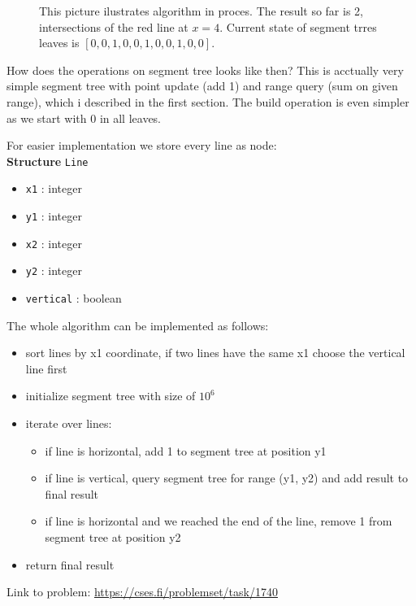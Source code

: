 \documentclass{article}
\begin{document}
\begin{figure}[H]
    \centering
    
    \caption{This picture ilustrates algorithm in proces. The result so far is 2, intersections of the red line at $x=4$. Current state of segment trres leaves is $[0,0,1,0,0,1,0,0,1,0,0]$. }
\end{figure}

How does the operations on segment tree looks like then? 
This is acctually very simple segment tree with point update (add 1) and range query (sum on given range), which i described in the first section. The build operation is even simpler as we start with 0 in all leaves.

For easier implementation we store every line as node: \\
\textbf{Structure} \texttt{Line}  
\begin{itemize}
    \item \texttt{x1} : integer
    \item \texttt{y1} : integer
    \item \texttt{x2} : integer
    \item \texttt{y2} : integer
    \item \texttt{vertical} : boolean
\end{itemize}
The whole algorithm can be implemented as follows:

\begin{itemize}
    \item sort lines by x1 coordinate, if two lines have the same x1 choose the vertical line first
    \item initialize segment tree with size of $10^6$
    \item iterate over lines:
        \begin{itemize}
            \item if line is horizontal, add 1 to segment tree at position y1
            \item if line is vertical, query segment tree for range (y1, y2) and add result to final result
            \item if line is horizontal and we reached the end of the line, remove 1 from segment tree at position y2
        \end{itemize}
    \item return final result
\end{itemize}

Link to problem: \url{https://cses.fi/problemset/task/1740}
\end{document}
